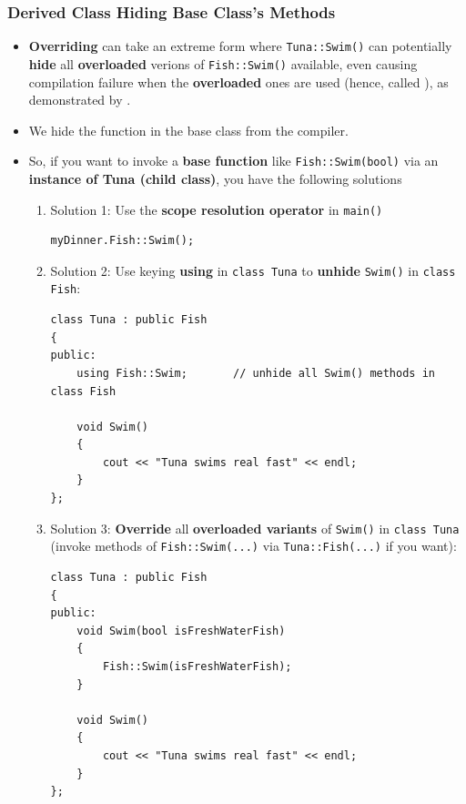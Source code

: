 \documentclass[10pt]{article}
\newcommand{\vocab}[1]{\fbox{\textbf{\textit{#1}}}}
\begin{document}
\newpage

\subsubsection{Derived Class Hiding Base Class's Methods}
\begin{itemize}
\item \textbf{Overriding} can take an extreme form where \verb|Tuna::Swim()| can potentially \textbf{hide} all \textbf{overloaded} verions of \verb|Fish::Swim()| available, even causing compilation failure when the \textbf{overloaded} ones are used (hence, called \vocab{hidden}), as demonstrated by \textbf{}.

\item We hide the function in the base class from the compiler.

\item So, if you want to invoke a \textbf{base function} like \verb|Fish::Swim(bool)| via an \textbf{instance of Tuna (child class)}, you have the following solutions

	\begin{enumerate}
		\item Solution 1: Use the \textbf{scope resolution operator} in \verb|main()|
		\begin{verbatim}
myDinner.Fish::Swim();
		\end{verbatim}

	\item Solution 2: Use keying \textbf{using} in \verb|class Tuna| to \textbf{unhide} \verb|Swim()| in \verb|class Fish|:
		\begin{verbatim}
class Tuna : public Fish
{
public:
	using Fish::Swim;		// unhide all Swim() methods in class Fish

	void Swim()
	{
		cout << "Tuna swims real fast" << endl;
	}
};
		\end{verbatim}

	\item Solution 3: \textbf{Override} all \textbf{overloaded variants} of \verb|Swim()| in \verb|class Tuna| (invoke methods of \verb|Fish::Swim(...)| via \verb|Tuna::Fish(...)| if you want):

		\begin{verbatim}
class Tuna : public Fish
{
public:
	void Swim(bool isFreshWaterFish)
	{
		Fish::Swim(isFreshWaterFish);
	}

	void Swim()
	{
		cout << "Tuna swims real fast" << endl;
	}
};
		\end{verbatim}
	\end{enumerate}
\end{itemize}
\end{document}
